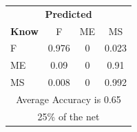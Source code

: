\documentclass[12pt]{article} %
\begin{document}
\begin{minipage}{0.5\textwidth}
\begin{center}
\begin{tabular}{l|c|c|c|}
 \multicolumn{4}{c}{ \textbf{ Predicted}}\\
 \textbf{Know}&F&ME&MS\\ \hline\hline
F   &0.976&0&0.023\\
ME &0.09&0&0.91\\
MS &0.008&0&0.992\\
\multicolumn{4}{c}{Average Accuracy is 0.65}\\
\multicolumn{4}{c}{25\%  of the net}\\
\end{tabular}
\end{center}
\end{minipage}
\end{document}
